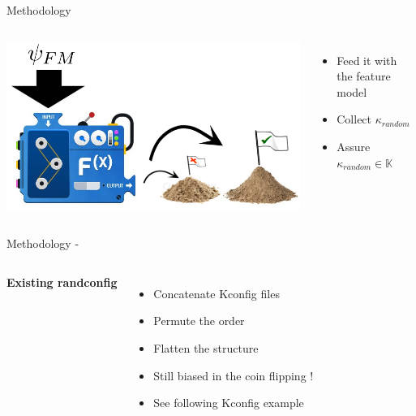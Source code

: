 \documentclass[mathserif,serif]{beamer}
\newenvironment{items}{
\begin{itemize}
  \setlength{\itemsep}{0pt}
  \setlength{\parskip}{7pt}
  \setlength{\parsep}{4pt}
}{\end{itemize}}
\begin{document}
\begin{frame}[t]{Methodology}


    \begin{columns}[T]
        \includegraphics[scale=.5]{machine.png}
        \begin{items}
            \item Feed it with the feature model
            \pause
            \item Collect $\kappa_{random}$
            \pause
            \item Assure $\kappa_{random} \in \mathbb{K}$
        \end{items}
    \end{columns}
\end{frame}
    

\begin{frame}[t]{Methodology - }

    \begin{columns}[T]
        \textbf{Existing randconfig}
        \pause
        \begin{items}
            \item Concatenate Kconfig files
            \item Permute the order
            \item Flatten the structure
            \pause
            \item Still biased in the coin flipping !
            \item See following Kconfig example
        \end{items}
    \end{columns}

\end{frame}
\end{document}

